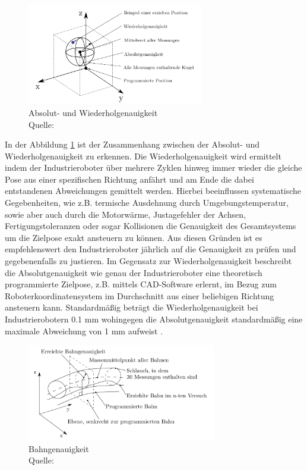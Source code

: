 \begin{figure}[htb]
	\centering
	\includegraphics[width=0.686\textwidth]{images/stand_der_technik/absolutgenauigkeit_und_wiederholgenauigkeit}
	\caption[Absolut- und Wiederholgenauigkeit]{Absolut- und Wiederholgenauigkeit \\Quelle: \cite[29]{pott_industrielle_2019}}
	\label{fig:absolutgenauigkeit_und_wiederholgenauigkeit}
\end{figure}
\FloatBarrier

In der Abbildung \ref{fig:absolutgenauigkeit_und_wiederholgenauigkeit} ist der Zusammenhang zwischen der Absolut- und Wiederholgenauigkeit zu erkennen. Die Wiederholgenauigkeit wird ermittelt indem der Industrieroboter über mehrere Zyklen hinweg immer wieder die gleiche Pose aus einer spezifischen Richtung anfährt und am Ende die dabei entstandenen Abweichungen gemittelt werden. Hierbei beeinflussen systematische Gegebenheiten, wie z.B. termische Ausdehnung durch Umgebungstemperatur, sowie aber auch durch die Motorwärme, Justagefehler der Achsen, Fertigungstoleranzen oder sogar Kollisionen die Genauigkeit des Gesamtsystems um die Zielpose exakt ansteuern zu können. Aus diesen Gründen ist es empfehlenswert den Industrieroboter jährlich auf die Genauigkeit zu prüfen und gegebenenfalls zu justieren. Im Gegensatz zur Wiederholgenauigkeit beschreibt die Absolutgenauigkeit wie genau der Industrieroboter eine theoretisch programmierte Zielpose, z.B. mittels CAD-Software erlernt, im Bezug zum Roboterkoordinatensystem im Durchschnitt aus einer beliebigen Richtung ansteuern kann. Standardmäßig beträgt die Wiederholgenauigkeit bei Industrierobotern \num{0,1} mm wohingegen die Absolutgenauigkeit standardmäßig eine maximale Abweichung von 1 mm aufweist \cite[28\psqq]{pott_industrielle_2019}.

\begin{figure}[htb]
	\centering
	\includegraphics[width=0.735\textwidth]{images/stand_der_technik/bahngenauigkeit}
	\caption[Bahngenauigkeit]{Bahngenauigkeit \\Quelle: \cite[30]{pott_industrielle_2019}}
	\label{fig:bahngenauigkeit}
\end{figure}
\FloatBarrier

